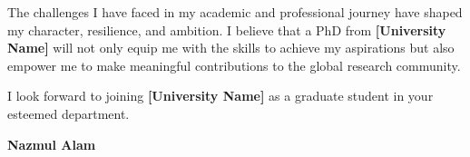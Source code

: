 \documentclass[11pt]{article}
\begin{document}
The challenges I have faced in my academic and professional journey have shaped my character, resilience, and ambition.
I believe that a PhD from \textbf{[University Name]} will not only equip me with the skills to achieve my aspirations but also empower me to make meaningful contributions to the global research community.

I look forward to joining \textbf{[University Name]} as a graduate student in your esteemed department.

\begin{flushleft}
    \textbf{Nazmul Alam}
\end{flushleft}
\end{document}
